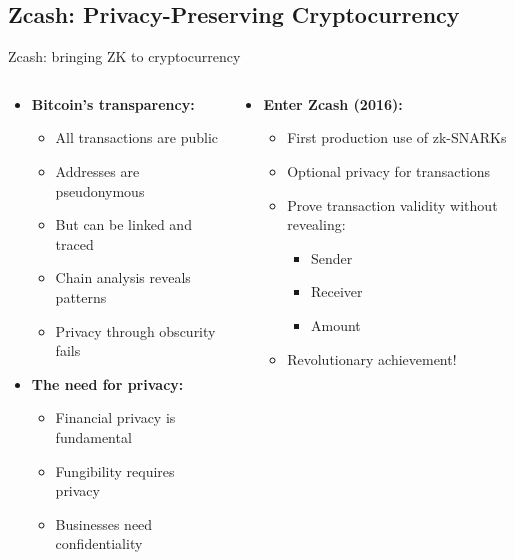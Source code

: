 \documentclass[aspectratio=169, lualatex, handout]{beamer}
\begin{document}
\subsection{Zcash: Privacy-Preserving Cryptocurrency}

\begin{frame}{Zcash: bringing ZK to cryptocurrency}
	\begin{columns}[c]
		\begin{column}{0.5\textwidth}
			\begin{itemize}
				\item \textbf{Bitcoin's transparency:}
				      \begin{itemize}
					      \item All transactions are public
					      \item Addresses are pseudonymous
					      \item But can be linked and traced
					      \item Chain analysis reveals patterns
					      \item Privacy through obscurity fails
				      \end{itemize}
				\item \textbf{The need for privacy:}
				      \begin{itemize}
					      \item Financial privacy is fundamental
					      \item Fungibility requires privacy
					      \item Businesses need confidentiality
				      \end{itemize}
			\end{itemize}
		\end{column}
		\begin{column}{0.5\textwidth}
			\begin{itemize}
				\item \textbf{Enter Zcash (2016):}
				      \begin{itemize}
					      \item First production use of zk-SNARKs
					      \item Optional privacy for transactions
					      \item Prove transaction validity without revealing:
					            \begin{itemize}
						            \item Sender
						            \item Receiver
						            \item Amount
					            \end{itemize}
					      \item Revolutionary achievement!
				      \end{itemize}
			\end{itemize}
		\end{column}
	\end{columns}
\end{frame}
\end{document}

